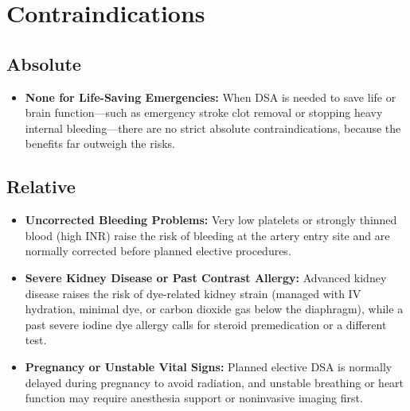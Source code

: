 \section{Contraindications}

\subsection{Absolute}
\begin{itemize}
\item \textbf{None for Life-Saving Emergencies:} When DSA is needed to save life or brain function---such as emergency stroke clot removal or stopping heavy internal bleeding---there are no strict absolute contraindications, because the benefits far outweigh the risks.
\end{itemize}

\subsection{Relative}
\begin{itemize}
\item \textbf{Uncorrected Bleeding Problems:} Very low platelets or strongly thinned blood (high INR) raise the risk of bleeding at the artery entry site and are normally corrected before planned elective procedures.
\item \textbf{Severe Kidney Disease or Past Contrast Allergy:} Advanced kidney disease raises the risk of dye-related kidney strain (managed with IV hydration, minimal dye, or carbon dioxide gas below the diaphragm), while a past severe iodine dye allergy calls for steroid premedication or a different test.
\item \textbf{Pregnancy or Unstable Vital Signs:} Planned elective DSA is normally delayed during pregnancy to avoid radiation, and unstable breathing or heart function may require anesthesia support or noninvasive imaging first.
\end{itemize}

